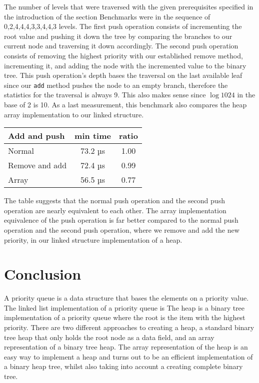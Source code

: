 \documentclass[a4paper,11pt]{article}
\begin{document}
        The number of levels that were traversed with the given prerequisites specified in the introduction of the section Benchmarks were in the sequence of {0,2,4,4,4,3,3,4,4,3} levels. The first push operation consists of incrementing the root value and pushing it down the tree by comparing the branches to our current node and traversing it down accordingly. The second push operation consists of removing the highest priority with our established remove method, incrementing it, and adding the node with the incremented value to the binary tree. This push operation's depth bases the traversal on the last available leaf since our \texttt{add} method pushes the node to an empty branch, therefore the statistics for the traversal is always 9. This also makes sense since $\log 1024$ in the base of 2 is 10. As a last measurement, this benchmark also compares the heap array implementation to our linked structure.
        
\begin{table}[h]
\begin{center}
\begin{tabular}{l|c|c}
\textbf{Add and push} & \textbf{min time} & \textbf{ratio}\\
\hline
  Normal         & 73.2 µs & 1.00\\
  Remove and add & 72.4 µs & 0.99\\
  Array          & 56.5 µs & 0.77\\
\end{tabular}
\end{center}
\end{table}
        The table suggests that the normal push operation and the second push operation are nearly equivalent to each other. The array implementation equivalence of the push operation is far better compared to the normal push operation and the second push operation, where we remove and add the new priority, in our linked structure implementation of a heap. 
        
\section*{Conclusion}

    A priority queue is a data structure that bases the elements on a priority value. The linked list implementation of a priority queue is  The heap is a binary tree implementation of a priority queue where the root is the item with the highest priority. There are two different approaches to creating a heap, a standard binary tree heap that only holds the root node as a data field, and an array representation of a binary tree heap. The array representation of the heap is an easy way to implement a heap and turns out to be an efficient implementation of a binary heap tree, whilst also taking into account a creating complete binary tree.
    
\end{document}
